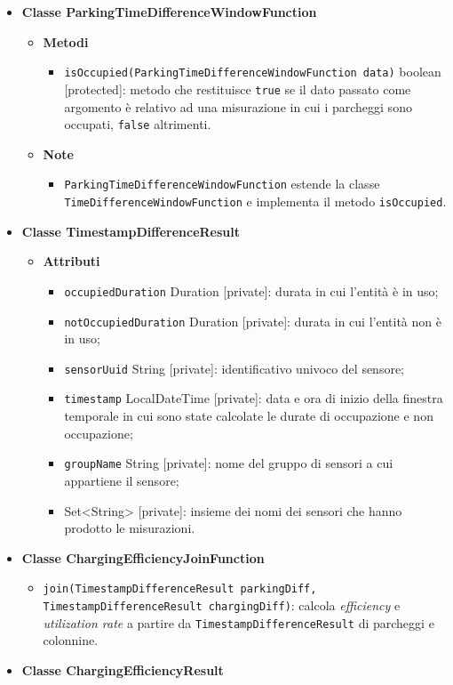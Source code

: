 \begin{itemize}
	\item \textbf{Classe ParkingTimeDifferenceWindowFunction}
	      \begin{itemize}
		      \item \textbf{Metodi}
		            \begin{itemize}
			            \item \texttt{isOccupied(ParkingTimeDifferenceWindowFunction data)} boolean [protected]: metodo che restituisce \texttt{true} se il dato passato come argomento è relativo ad una misurazione in cui i
			                  parcheggi sono occupati, \texttt{false} altrimenti.
		            \end{itemize}
		      \item \textbf{Note}
		            \begin{itemize}
			            \item \texttt{ParkingTimeDifferenceWindowFunction} estende la classe \\\texttt{TimeDifferenceWindowFunction} e implementa il metodo \texttt{isOccupied}.
		            \end{itemize}
	      \end{itemize}
	\item \textbf{Classe TimestampDifferenceResult}
	      \begin{itemize}
		      \item \textbf{Attributi}
		            \begin{itemize}
			            \item \texttt{occupiedDuration} Duration [private]: durata in cui l'entità è in uso;
			            \item \texttt{notOccupiedDuration} Duration [private]: durata in cui l'entità non è in uso;
			            \item \texttt{sensorUuid} String [private]: identificativo univoco del sensore;
			            \item \texttt{timestamp} LocalDateTime [private]: data e ora di inizio della finestra temporale in cui sono state calcolate le durate di occupazione e non occupazione;
			            \item \texttt{groupName} String [private]: nome del gruppo di sensori a cui appartiene il sensore;
			            \item \texttt{} Set<String> [private]: insieme dei nomi dei sensori che hanno prodotto le misurazioni.
		            \end{itemize}
	      \end{itemize}
	\item \textbf{Classe ChargingEfficiencyJoinFunction}
	      \begin{itemize}
		      \item \texttt{join(TimestampDifferenceResult parkingDiff, TimestampDifferenceResult chargingDiff)}: calcola \textit{efficiency} e \textit{utilization rate} a partire da \texttt{TimestampDifferenceResult}
		            di parcheggi e colonnine.
	      \end{itemize}
	\item \textbf{Classe ChargingEfficiencyResult}


\end{itemize}

